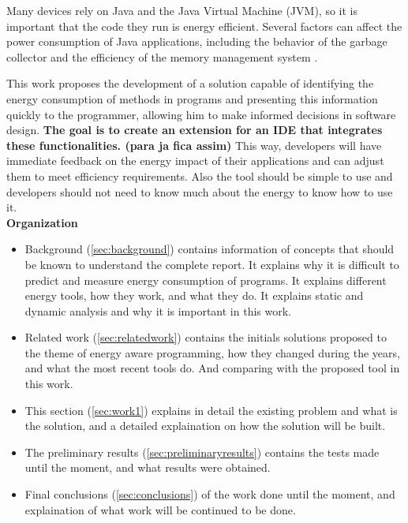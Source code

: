 \documentclass[sigplan]{acmart}
\begin{document}
Many devices rely on Java and the Java Virtual Machine (JVM), so it is important that the code they run is energy efficient. Several factors can affect the power consumption of Java applications, including the behavior of the garbage collector and the efficiency of the memory management system \cite{10.5555/1267847.1267870}. 

This work proposes the development of a solution capable of identifying the energy consumption of methods in programs and presenting this information quickly to the programmer, allowing him to make informed decisions in software design. \textbf{The goal is to create an extension for an IDE that integrates these functionalities. (para ja fica assim)} This way, developers will have immediate feedback on the energy impact of their applications and can adjust them to meet efficiency requirements. Also the tool should be simple to use and developers should not need to know much about the energy to know how to use it. \\

\textbf{Organization} 

\begin{itemize}

\item Background (\ref{sec:background}) contains information of concepts that should be known to understand the complete report. It explains why it is difficult to predict and measure energy consumption of programs. It explains different energy tools, how they work, and what they do. It explains static and dynamic analysis and why it is important in this work.

\item Related work (\ref{sec:relatedwork}) contains the initials solutions proposed to the theme of energy aware programming, how they changed during the years, and what the most recent tools do. And comparing with the proposed tool in this work.

\item This section (\ref{sec:work1}) explains in detail the existing problem and what is the solution, and a detailed explaination on how the solution will be built.

\item The preliminary results (\ref{sec:preliminaryresults}) contains the tests made until the moment, and what results were obtained.

\item  Final conclusions (\ref{sec:conclusions}) of the work done until the moment, and explaination of what work will be continued to be done.\\
\end{itemize}
\end{document}
